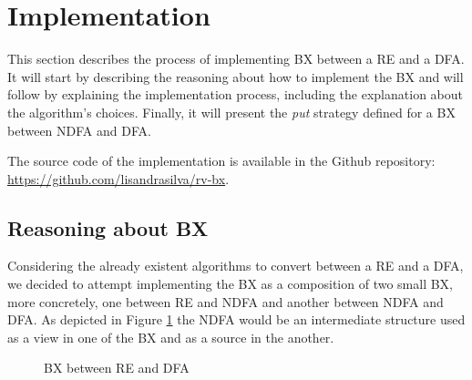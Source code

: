 \section{Implementation}
This section describes the process of implementing BX between a RE and a DFA. It will start by describing the reasoning about how to implement the BX and will follow by explaining the implementation process, including the explanation about the algorithm's choices. Finally, it will present the \textit{put} strategy defined for a BX between NDFA and DFA.

The source code of the implementation is available in the Github repository:  \url{https://github.com/lisandrasilva/rv-bx}.

\subsection{Reasoning about BX}
Considering the already existent algorithms to convert between a RE and a DFA, we decided to attempt implementing the BX as a composition of two small BX, more concretely, one between RE and NDFA and another between NDFA and DFA. As depicted in Figure \ref{fig:BX} the NDFA would be an intermediate structure used as a view in one of the BX and as a source in the another.  

\begin{figure}
    \centering
    \caption{BX between RE and DFA}
    \label{fig:BX}
\end{figure}

